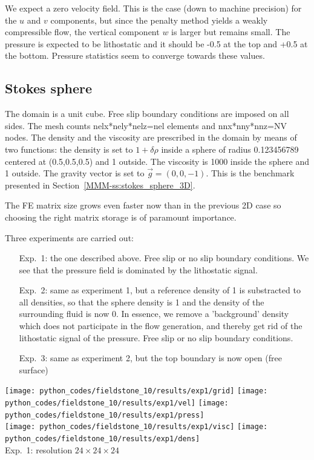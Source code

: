 We expect a zero velocity field. This is the case (down to machine precision) for the $u$
and $v$ components, but since the penalty method yields a weakly compressible flow, 
the vertical component $w$ is larger but remains small.
The pressure is expected to be lithostatic and it should be -0.5 at the top and +0.5 at 
the bottom. Pressure statistics seem to converge towards these values. 





\subsection*{Stokes sphere}

The domain is a unit cube. Free slip boundary conditions 
are imposed on all sides. The mesh counts 
nelx*nely*nelz=nel elements and 
nnx*nny*nnz=NV nodes.
The density and the viscosity are prescribed in the domain 
by means of two functions:
the density is set to $1+\delta \rho$ inside a sphere of radius 0.123456789 centered 
at (0.5,0.5,0.5) and 1 outside. The viscosity is 1000 inside the sphere
and 1 outside.  The gravity vector is set to $\vec{g}=(0,0,-1)$.
This is the benchmark presented in Section~\ref{MMM-ss:stokes_sphere_3D}.

The FE matrix size grows even faster now than in the previous 2D case so
choosing the right matrix storage is of paramount importance. 

Three experiments are carried out:
\begin{enumerate}
\item[Exp.~1:] the one described above.
Free slip or no slip boundary conditions.
We see that the pressure field is dominated by the lithostatic signal.
\item[Exp.~2:] same as experiment 1, but a reference density of 1 is substracted to all densities, so that 
the sphere density is 1 and the density of the surrounding fluid is now 0. In essence, we remove a
'background' density which does not participate in the flow generation, and thereby get rid of the 
lithostatic signal of the pressure.
Free slip or no slip boundary conditions.
\item[Exp.~3:] same as experiment 2, but the top boundary is now open (free surface)
\end{enumerate} 

\begin{center}
\texttt{[image: python\_codes/fieldstone\_10/results/exp1/grid]}
\texttt{[image: python\_codes/fieldstone\_10/results/exp1/vel]}
\texttt{[image: python\_codes/fieldstone\_10/results/exp1/press]}\\
\texttt{[image: python\_codes/fieldstone\_10/results/exp1/visc]}
\texttt{[image: python\_codes/fieldstone\_10/results/exp1/dens]}\\
{\small Exp.~1: resolution $24\times 24\times 24$}
\end{center}

